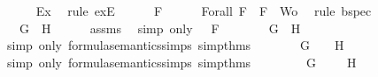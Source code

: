 \begin{isabellebody}
\ \ \ \ \isamarkupfalse%
\ Ex{}\ \isamarkupfalse%
\ {\isacharparenleft}rule\ exE{\isacharparenright}\isanewline
\ \ \isamarkupfalse%
\ {\isachardoublequoteopen}{\isasymA}\ {\isasymTurnstile}\ F{\isachardoublequoteclose}\isanewline
\ \ \ \ \isamarkupfalse%
\ Forall{}\ {\isacartoucheopen}F\ {\isasymin}\ {\isacharbraceleft}F{\isacharbraceright}\ {\isasymunion}\ Wo{\isacartoucheclose}\ \isamarkupfalse%
\ {\isacharparenleft}rule\ bspec{\isacharparenright}\isanewline
\ \ \isamarkupfalse%
\ \isamarkupfalse%
\ {\isachardoublequoteopen}{\isasymA}\ {\isasymTurnstile}\ \isactrlbold {\isasymnot}{\isacharparenleft}G\ \isactrlbold {\isasymor}\ H{\isacharparenright}{\isachardoublequoteclose}\isanewline
\ \ \ \ \isamarkupfalse%
\ assms{\isacharparenleft}{}{\isacharparenright}\ \isamarkupfalse%
\ {\isacharparenleft}simp\ only{\isacharcolon}\ {\isacartoucheopen}{\isasymA}\ {\isasymTurnstile}\ F{\isacartoucheclose}{\isacharparenright}\isanewline
\ \ \isamarkupfalse%
\ \isamarkupfalse%
\ {\isachardoublequoteopen}{\isasymnot}{\isacharparenleft}{\isasymA}\ {\isasymTurnstile}\ {\isacharparenleft}G\ \isactrlbold {\isasymor}\ H{\isacharparenright}{\isacharparenright}{\isachardoublequoteclose}\isanewline
\ \ \ \ \isamarkupfalse%
\ {\isacharparenleft}simp\ only{\isacharcolon}\ formula{\isacharunderscore}semantics{\isachardot}simps{\isacharparenleft}{}{\isacharparenright}\ simp{\isacharunderscore}thms{\isacharparenleft}{}{\isacharparenright}{\isacharparenright}\isanewline
\ \ \isamarkupfalse%
\ \isamarkupfalse%
\ {\isachardoublequoteopen}{\isasymnot}{\isacharparenleft}{\isasymA}\ {\isasymTurnstile}\ G\ {\isasymor}\ {\isasymA}\ {\isasymTurnstile}\ H{\isacharparenright}{\isachardoublequoteclose}\isanewline
\ \ \ \ \isamarkupfalse%
\ {\isacharparenleft}simp\ only{\isacharcolon}\ formula{\isacharunderscore}semantics{\isachardot}simps{\isacharparenleft}{}{\isacharparenright}\ simp{\isacharunderscore}thms{\isacharparenleft}{}{\isacharparenright}{\isacharparenright}\isanewline
\ \ \isamarkupfalse%
\ \isamarkupfalse%
\ {\isachardoublequoteopen}{\isasymnot}\ {\isasymA}\ {\isasymTurnstile}\ G\ {\isasymand}\ {\isasymnot}\ {\isasymA}\ {\isasymTurnstile}\ H{\isachardoublequoteclose}\ \isanewline
\ \ \ \ \isamarkupfalse%

\end{isabellebody}
